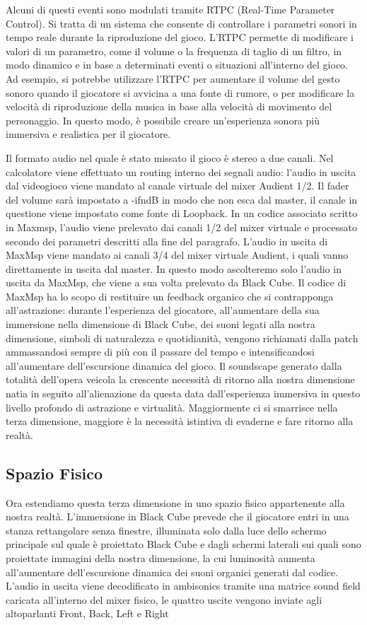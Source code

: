 	Alcuni di questi eventi sono modulati tramite RTPC (Real-Time Parameter Control). Si tratta di un sistema che consente di controllare i parametri sonori in tempo reale durante la riproduzione del gioco. 
	L'RTPC permette di modificare i valori di un parametro, come il volume o la frequenza di taglio di un filtro, in modo dinamico e in base a determinati eventi o situazioni all'interno del gioco. Ad esempio, si potrebbe utilizzare l'RTPC per aumentare il volume del gesto sonoro quando il giocatore si avvicina a una fonte di rumore, o per modificare la velocità di riproduzione della musica in base alla velocità di movimento del personaggio. In questo modo, è possibile creare un'esperienza sonora più immersiva e realistica per il giocatore.
	
	Il formato audio nel quale è stato missato il gioco è stereo a due canali. Nel calcolatore viene effettuato un routing interno dei segnali audio: l'audio in uscita dal videogioco viene mandato al canale virtuale del mixer Audient 1/2. Il fader del volume sarà impostato a -ifndB in modo che non esca dal master, il canale in questione viene impostato come fonte di Loopback. In un codice associato scritto in Maxmsp, l'audio viene prelevato dai canali 1/2 del mixer virtuale e processato secondo dei parametri descritti alla fine del paragrafo. L'audio in uscita di MaxMsp viene mandato ai canali 3/4 del mixer virtuale Audient, i quali vanno direttamente in uscita dal master. In questo modo ascolteremo solo l'audio in uscita da MaxMsp, che viene a sua volta prelevato da Black Cube.
	Il codice di MaxMsp ha lo scopo di restituire un feedback organico che si contrapponga all'astrazione: durante l'esperienza del giocatore, all'aumentare della sua immersione nella dimensione di Black Cube, dei suoni legati alla nostra dimensione, simboli di naturalezza e quotidianità, vengono richiamati dalla patch ammassandosi sempre di più con il passare del tempo e intensificandosi all'aumentare dell'escursione dinamica del gioco.
	Il soundscape generato dalla totalità dell'opera veicola la crescente necessità di ritorno alla nostra dimensione natia in seguito all'alienazione da questa data dall'esperienza immersiva in questo livello profondo di astrazione e virtualità. Maggiormente ci si smarrisce nella terza dimensione, maggiore è la necessità istintiva di evaderne e fare ritorno alla realtà.
	
	\subsection*{Spazio Fisico}
	Ora estendiamo questa terza dimensione in uno spazio fisico appartenente alla nostra realtà. L'immersione in Black Cube prevede che il giocatore entri in una stanza rettangolare senza finestre, illuminata solo dalla luce dello schermo principale sul quale è proiettato Black Cube e dagli schermi laterali sui quali sono proiettate immagini della nostra dimensione, la cui luminosità aumenta all'aumentare  dell'escursione dinamica dei suoni organici generati dal codice.
	L'audio in uscita viene decodificato in ambisonics tramite una matrice sound field caricata all'interno del mixer fisico, le quattro uscite vengono inviate agli altoparlanti Front, Back, Left e Right
	
